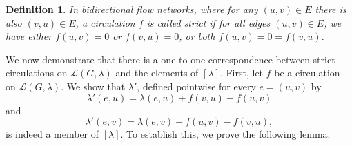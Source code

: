 \documentclass[10pt,twocolumn]{article}
\newtheorem{definition}{Definition}[section]
\begin{document}
\begin{definition}
  In bidirectional flow networks, where for any \((u,v) \in E\) there is also \((v,u) \in E\), a circulation \(f\) is called strict if for all edges \((u,v) \in E\), we have either \(f(u,v) = 0\) or \(f(v,u) = 0\), or both \(f(u,v) = 0 = f(v,u)\).
\end{definition}

We now demonstrate that there is a one-to-one correspondence between strict circulations on \(\mathcal{L}(G,\lambda)\) and the elements of \([\lambda]\).  
First, let \(f\) be a circulation on \(\mathcal{L}(G,\lambda)\).  
We show that \(\lambda'\), defined pointwise for every \(e = (u,v)\) by
\begin{equation}
  \lambda'(e,u) = \lambda(e,u) + f(v,u) - f(u,v)
\end{equation}
and
\begin{equation}
  \lambda'(e,v) = \lambda(e,v) + f(u,v) - f(v,u),
\end{equation}
is indeed a member of \([\lambda]\).  
To establish this, we prove the following lemma.
\end{document}

